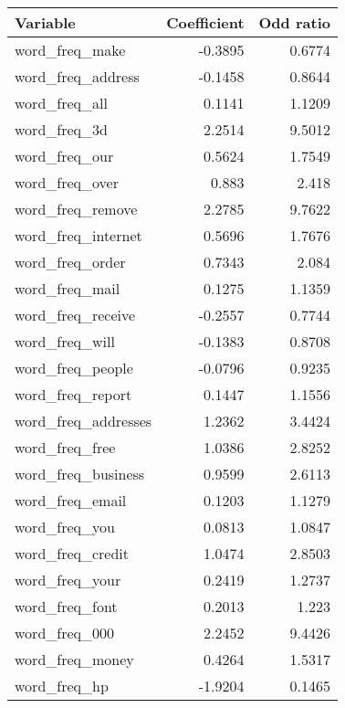 \begin{homeworkProblem}
\begin{homeworkSection}{2.1}
{			}
			
			\begin{table}[htbp]
			\footnotesize
			\begin{center}
			\begin{tabular}{|l|r|r|}
				\hline
				\textbf{Variable} & \multicolumn{1}{l|}{\textbf{Coefficient}} & \multicolumn{1}{l|}{\textbf{Odd ratio}} \\ \hline
				word\_freq\_make & -0.3895 & 0.6774 \\ \hline
				word\_freq\_address & -0.1458 & 0.8644 \\ \hline
				word\_freq\_all & 0.1141 & 1.1209 \\ \hline
				word\_freq\_3d & 2.2514 & 9.5012 \\ \hline
				word\_freq\_our & 0.5624 & 1.7549 \\ \hline
				word\_freq\_over & 0.883 & 2.418 \\ \hline
				word\_freq\_remove & 2.2785 & 9.7622 \\ \hline
				word\_freq\_internet & 0.5696 & 1.7676 \\ \hline
				word\_freq\_order & 0.7343 & 2.084 \\ \hline
				word\_freq\_mail & 0.1275 & 1.1359 \\ \hline
				word\_freq\_receive & -0.2557 & 0.7744 \\ \hline
				word\_freq\_will & -0.1383 & 0.8708 \\ \hline
				word\_freq\_people & -0.0796 & 0.9235 \\ \hline
				word\_freq\_report & 0.1447 & 1.1556 \\ \hline
				word\_freq\_addresses & 1.2362 & 3.4424 \\ \hline
				word\_freq\_free & 1.0386 & 2.8252 \\ \hline
				word\_freq\_business & 0.9599 & 2.6113 \\ \hline
				word\_freq\_email & 0.1203 & 1.1279 \\ \hline
				word\_freq\_you & 0.0813 & 1.0847 \\ \hline
				word\_freq\_credit & 1.0474 & 2.8503 \\ \hline
				word\_freq\_your & 0.2419 & 1.2737 \\ \hline
				word\_freq\_font & 0.2013 & 1.223 \\ \hline
				word\_freq\_000 & 2.2452 & 9.4426 \\ \hline
				word\_freq\_money & 0.4264 & 1.5317 \\ \hline
				word\_freq\_hp & -1.9204 & 0.1465 \\ \hline

\end{tabular}
\end{center}
\end{table}
\end{homeworkSection}
\end{homeworkProblem}
